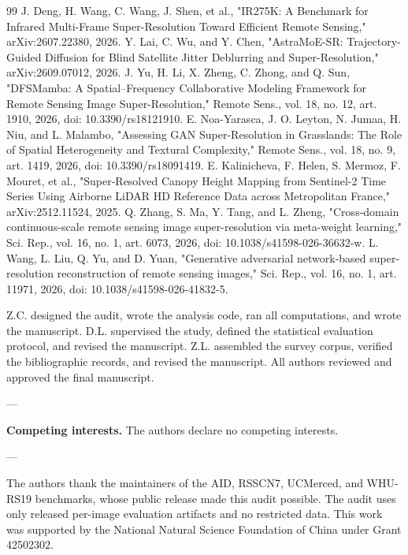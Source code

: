 \documentclass[pdflatex,sn-nature]{sn-jnl}
\begin{document}
\begin{thebibliography}{99}
J. Deng, H. Wang, C. Wang, J. Shen, et al., "IR275K: A Benchmark for Infrared Multi-Frame Super-Resolution Toward Efficient Remote Sensing," arXiv:2607.22380, 2026.
Y. Lai, C. Wu, and Y. Chen, "AstraMoE-SR: Trajectory-Guided Diffusion for Blind Satellite Jitter Deblurring and Super-Resolution," arXiv:2609.07012, 2026.
J. Yu, H. Li, X. Zheng, C. Zhong, and Q. Sun, "DFSMamba: A Spatial--Frequency Collaborative Modeling Framework for Remote Sensing Image Super-Resolution," Remote Sens., vol. 18, no. 12, art. 1910, 2026, doi: 10.3390/rs18121910.
E. Noa-Yarasca, J. O. Leyton, N. Jumaa, H. Niu, and L. Malambo, "Assessing GAN Super-Resolution in Grasslands: The Role of Spatial Heterogeneity and Textural Complexity," Remote Sens., vol. 18, no. 9, art. 1419, 2026, doi: 10.3390/rs18091419.
E. Kalinicheva, F. Helen, S. Mermoz, F. Mouret, et al., "Super-Resolved Canopy Height Mapping from Sentinel-2 Time Series Using Airborne LiDAR HD Reference Data across Metropolitan France," arXiv:2512.11524, 2025.
Q. Zhang, S. Ma, Y. Tang, and L. Zheng, "Cross-domain continuous-scale remote sensing image super-resolution via meta-weight learning," Sci. Rep., vol. 16, no. 1, art. 6073, 2026, doi: 10.1038/s41598-026-36632-w.
L. Wang, L. Liu, Q. Yu, and D. Yuan, "Generative adversarial network-based super-resolution reconstruction of remote sensing images," Sci. Rep., vol. 16, no. 1, art. 11971, 2026, doi: 10.1038/s41598-026-41832-5.
\end{thebibliography}


Z.C. designed the audit, wrote the analysis code, ran all computations, and wrote the manuscript. D.L. supervised the study, defined the statistical evaluation protocol, and revised the manuscript. Z.L. assembled the survey corpus, verified the bibliographic records, and revised the manuscript. All authors reviewed and approved the final manuscript.

---


\textbf{Competing interests.} The authors declare no competing interests.

---


The authors thank the maintainers of the AID, RSSCN7, UCMerced, and WHU-RS19 benchmarks, whose public release made this audit possible. The audit uses only released per-image evaluation artifacts and no restricted data. This work was supported by the National Natural Science Foundation of China under Grant 42502302.
\end{document}
